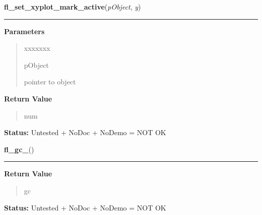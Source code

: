 \hspace{.8\funcindent}\begin{boxedminipage}{\funcwidth}

    \raggedright \textbf{fl\_set\_xyplot\_mark\_active}(\textit{pObject}, \textit{y})

    \vspace{-1.5ex}

    \rule{\textwidth}{0.5\fboxrule}
\setlength{\parskip}{2ex}
\setlength{\parskip}{1ex}
      \textbf{Parameters}
      \vspace{-1ex}

      \begin{quote}
        \begin{Ventry}{xxxxxxx}

          \item[pObject]

          pointer to object

        \end{Ventry}

      \end{quote}

      \textbf{Return Value}
    \vspace{-1ex}

      \begin{quote}
      num

      \end{quote}

\textbf{Status:} Untested + NoDoc + NoDemo = NOT OK



    \end{boxedminipage}

    \label{xformslib:library:fl_gc_}

    \vspace{0.5ex}

\hspace{.8\funcindent}\begin{boxedminipage}{\funcwidth}

    \raggedright \textbf{fl\_gc\_}()

    \vspace{-1.5ex}

    \rule{\textwidth}{0.5\fboxrule}
\setlength{\parskip}{2ex}
\setlength{\parskip}{1ex}
      \textbf{Return Value}
    \vspace{-1ex}

      \begin{quote}
      gc

      \end{quote}

\textbf{Status:} Untested + NoDoc + NoDemo = NOT OK



    \end{boxedminipage}


